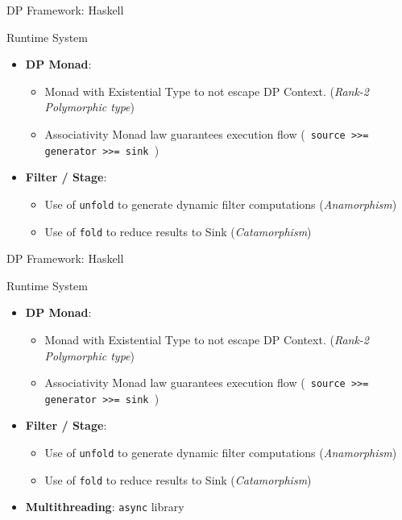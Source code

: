\documentclass{beamer}
\begin{document}
  \begin{frame}[fragile]{DP Framework: Haskell}
    \begin{block}{Runtime System}
      \begin{itemize}
        \item \textbf{DP Monad}:
        \begin{itemize} 
        \item Monad with Existential Type to not escape DP Context. (\textit{Rank-2 Polymorphic type})
        \item Associativity Monad law guarantees execution flow (\texttt{ source >>= generator >>= sink }) 
        \end{itemize}
        \item \textbf{Filter / Stage}: 
        \begin{itemize}
          \item Use of \texttt{unfold} to generate dynamic filter computations (\textit{Anamorphism})
          \item Use of \texttt{fold} to reduce results to Sink (\textit{Catamorphism})
        \end{itemize}
      \end{itemize}
    \end{block}
    \end{frame}
  
  \begin{frame}[fragile]{DP Framework: Haskell}
    \begin{block}{Runtime System}
      \begin{itemize}
        \item \textbf{DP Monad}:
        \begin{itemize} 
        \item Monad with Existential Type to not escape DP Context. (\textit{Rank-2 Polymorphic type})
        \item Associativity Monad law guarantees execution flow (\texttt{ source >>= generator >>= sink }) 
        \end{itemize}
        \item \textbf{Filter / Stage}: 
        \begin{itemize}
          \item Use of \texttt{unfold} to generate dynamic filter computations (\textit{Anamorphism})
          \item Use of \texttt{fold} to reduce results to Sink (\textit{Catamorphism})
        \end{itemize}
        \item \textbf{Multithreading}: \texttt{async} library
      \end{itemize}
    \end{block}
    \end{frame}
  
\end{document}
